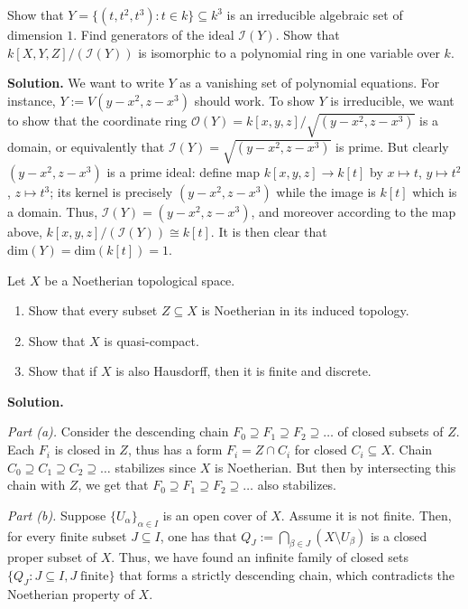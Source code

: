 \documentclass{template}
\begin{document}
\begin{problem}[Exercise 2]
    Show that $Y=\{(t,t^2,t^3): t \in k\} \subseteq k^3$ is an irreducible
    algebraic set of dimension $1$. Find generators of the ideal
    $\mathcal{I}(Y)$. Show that $k[X,Y,Z]/(\mathcal{I}(Y))$ is isomorphic to a
    polynomial ring in one variable over $k$.
\end{problem}

\textbf{Solution.} We want to write $Y$ as a vanishing set of polynomial
equations. For instance, $Y := V(y-x^2,z-x^3)$ should work. To show $Y$ is
irreducible, we want to show that the coordinate ring $\mathcal{O}(Y) =
k[x,y,z]/\sqrt{(y-x^2,z-x^3)}$ is a domain, or equivalently that $\mathcal{I}(Y)
= \sqrt{(y-x^2,z-x^3)}$ is prime. But clearly $(y-x^2,z-x^3)$ is a prime ideal:
define map $k[x,y,z] \to k[t]$ by $x \mapsto t$, $y \mapsto t^2$, $z \mapsto
t^3$; its kernel is precisely $(y-x^2,z-x^3)$ while the image is $k[t]$ which is
a domain. Thus, $\mathcal{I}(Y) = (y-x^2,z-x^3)$, and moreover according to the
map above, $k[x,y,z]/(\mathcal{I}(Y)) \cong k[t]$. It is then clear that
$\text{dim}(Y)=\text{dim}(k[t]) = 1$.

\begin{problem}[Exercise 3]
    Let $X$ be a Noetherian topological space.
    \begin{enumerate}
        \item[(a)] Show that every subset $Z \subseteq X$ is Noetherian in its 
        induced topology.
        \item[(b)] Show that $X$ is quasi-compact.
        \item[(c)] Show that if $X$ is also Hausdorff, then it is finite and
        discrete. 
    \end{enumerate}
\end{problem}

\textbf{Solution.} 

\textit{Part (a).} Consider the descending chain $F_0 \supseteq F_1 \supseteq
F_2 \supseteq \dots$ of closed subsets of $Z$. Each $F_i$ is closed in $Z$, thus
has a form $F_i = Z \cap C_i$ for closed $C_i \subseteq X$. Chain $C_0 \supseteq
C_1 \supseteq C_2 \supseteq \dots$ stabilizes since $X$ is Noetherian. But then
by intersecting this chain with $Z$, we get that $F_0 \supseteq F_1 \supseteq
F_2 \supseteq \dots$ also stabilizes.

\textit{Part (b).} Suppose $\{U_{\alpha}\}_{\alpha \in I}$ is an open cover of
$X$. Assume it is not finite. Then, for every finite subset $J \subseteq I$, one
has that $Q_J := \bigcap_{\beta \in J}(X \setminus U_{\beta})$ is a closed
proper subset of $X$. Thus, we have found an infinite family of closed sets
$\{Q_J: J \subseteq I, J \; \text{finite}\}$ that forms a strictly descending
chain, which contradicts the Noetherian property of $X$.
\end{document}
